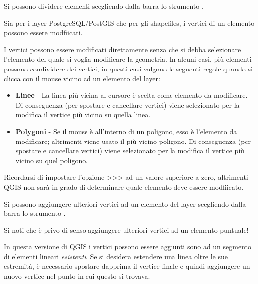 Si possono dividere elementi scegliendo dalla barra lo strumento .


Sia per i layer PostgreSQL/PostGIS che per gli shapefiles, i vertici di un
elemento possono essere modfiicati. 

I vertici possono essere modificati direttamente senza che si debba
selezionare l'elemento del quale si voglia modificare la geometria.
In alcuni casi, più elementi possono condividere dei vertici, in questi casi
valgono le seguenti regole quando si clicca con il mouse vicino ad un elemento
del layer:

\begin{itemize}
\item \textbf{Linee}    - La linea più vicina al cursore è scelta come
                          elemento da modificare.
                          Di conseguenza (per spostare e cancellare vertici)
                          viene selezionato per la modifica il vertice
                          più vicino su quella linea.

\item \textbf{Polygoni} - Se il mouse è all'interno di un poligono, esso è
                          l'elemento da modificare; altrimenti viene usato il più vicino
			  poligono.
                          Di conseguenza (per spostare e cancellare vertici)
                          viene selezionato per la modifica il vertice più
			  vicino su quel poligono.
\end{itemize}

Ricordarsi di impostare l'opzione
>>>
ad un valore superiore a zero, altrimenti QGIS non sarà in grado di
determinare quale elemento deve essere modfiicato.



Si possono aggiungere ulteriori vertici ad un elemento del layer scegliendo
dalla barra lo strumento .

Si noti che è privo di senso aggiungere ulteriori vertici ad un elemento
puntuale!

In questa versione di QGIS i vertici possono essere aggiunti sono ad un
segmento di elementi lineari \textit{esistenti}. Se si desidera estendere una
linea oltre le sue estremità, è necessario spostare dapprima il vertice finale
e quindi aggiungere un nuovo vertice nel punto in cui questo si trovava.

